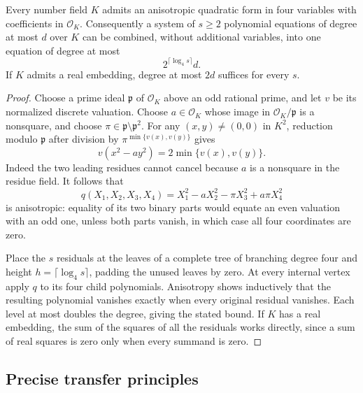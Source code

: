 \begin{lemma}\label{lem:four-variable-anisotropic}
Every number field $K$ admits an anisotropic quadratic form in four
variables with coefficients in $\mathcal O_K$.  Consequently a system
of $s\geq2$ polynomial equations of degree at most $d$ over $K$ can be
combined, without additional variables, into one equation of degree at
most
\[
 2^{\lceil\log_4 s\rceil}d.
\]
If $K$ admits a real embedding, degree at most $2d$ suffices for every
$s$.
\end{lemma}
\begin{proof}
Choose a prime ideal $\mathfrak p$ of $\mathcal O_K$ above an odd
rational prime, and let $v$ be its normalized discrete valuation.
Choose $a\in\mathcal O_K$ whose image in
$\mathcal O_K/\mathfrak p$ is a nonsquare, and choose
$\pi\in\mathfrak p\setminus\mathfrak p^2$.  For any
$(x,y)\ne(0,0)$ in $K^2$, reduction modulo $\mathfrak p$ after
division by $\pi^{\min\{v(x),v(y)\}}$ gives
\[
 v(x^2-ay^2)=2\min\{v(x),v(y)\}.
\]
Indeed the two leading residues cannot cancel because $a$ is a
nonsquare in the residue field.  It follows that
\[
 q(X_1,X_2,X_3,X_4)
 =X_1^2-aX_2^2-\pi X_3^2+a\pi X_4^2
\]
is anisotropic: equality of its two binary parts would equate an even
valuation with an odd one, unless both parts vanish, in which case all
four coordinates are zero.

Place the $s$ residuals at the leaves of a complete tree of branching
degree four and height $h=\lceil\log_4 s\rceil$, padding the unused
leaves by zero.  At every internal vertex apply $q$ to its four child
polynomials.  Anisotropy shows inductively that the resulting polynomial
vanishes exactly when every original residual vanishes.  Each level
at most doubles the degree, giving the stated bound.  If $K$ has a
real embedding, the sum of the squares of all the residuals works
directly, since a sum of real squares is zero only when every summand
is zero.
\end{proof}

\subsection{Precise transfer principles}

